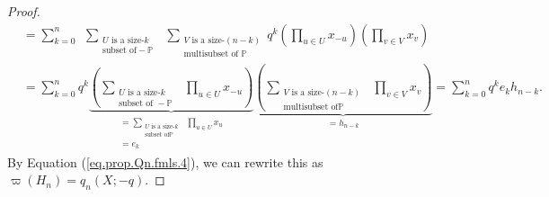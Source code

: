 \documentclass[revision]{FPSAC2024}
\begin{document}
\begin{proof}
\begin{align*}
&  =\sum_{k=0}^{n}\ \ \sum_{\substack{U\text{ is a size-}k\\\text{subset of
}-\mathbb{P}}}\ \ \sum_{\substack{V\text{ is a size-}\left(  n-k\right)
\\\text{multisubset of }\mathbb{P}}}q^{k}\left(  \prod_{u\in U}x_{-u}\right)
\left(  \prod_{v\in V}x_{v}\right) \\
&  =\sum_{k=0}^{n}q^{k}\underbrace{\left(  \sum_{\substack{U\text{ is a
size-}k\\\text{subset of }-\mathbb{P}}}\ \ \prod_{u\in U}x_{-u}\right)
}_{\substack{=\sum_{\substack{U\text{ is a size-}k\\\text{subset of
}\mathbb{P}}}\ \ \prod_{u\in U}x_{u}\\=e_{k}}}\underbrace{\left(
\sum_{\substack{V\text{ is a size-}\left(  n-k\right)  \\\text{multisubset of
}\mathbb{P}}}\ \ \prod_{v\in V}x_{v}\right)  }_{=h_{n-k}}
=\sum_{k=0}^{n}q^{k}e_{k}h_{n-k} .
\end{align*}
By Equation (\ref{eq.prop.Qn.fmls.4}), we can rewrite this
as $\varpi\left(H_n\right) = q_{n}(X;-q)$.
\end{proof}

\printbibliography
\end{document}
